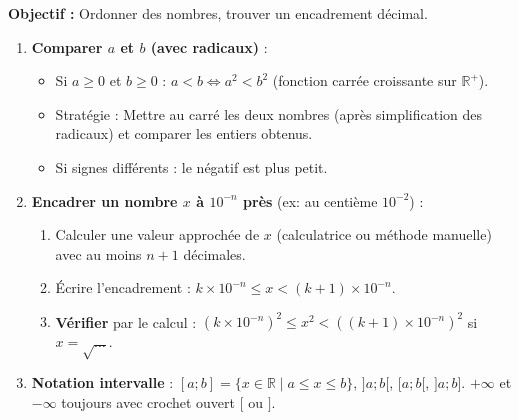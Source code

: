 \documentclass[11pt]{article}
\begin{document}
\begin{methode}
\textbf{Objectif :} Ordonner des nombres, trouver un encadrement décimal.
\begin{enumerate}
    \item \textbf{Comparer $a$ et $b$ (avec radicaux)} :
    \begin{itemize}
        \item Si $a \ge 0$ et $b \ge 0$ : $a < b \iff a^2 < b^2$ (fonction carrée croissante sur $\mathbb{R}^+$).
        \item Stratégie : Mettre au carré les deux nombres (après simplification des radicaux) et comparer les entiers obtenus.
        \item Si signes différents : le négatif est plus petit.
    \end{itemize}
    \item \textbf{Encadrer un nombre $x$ à $10^{-n}$ près} (ex: au centième $10^{-2}$) :
    \begin{enumerate}
        \item Calculer une valeur approchée de $x$ (calculatrice ou méthode manuelle) avec au moins $n+1$ décimales.
        \item Écrire l'encadrement : $k \times 10^{-n} \le x < (k+1) \times 10^{-n}$.
        \item \textbf{Vérifier} par le calcul : $(k \times 10^{-n})^2 \le x^2 < ((k+1) \times 10^{-n})^2$ si $x=\sqrt{\dots}$.
    \end{enumerate}
    \item \textbf{Notation intervalle} : $[a;b] = \{x \in \mathbb{R} \mid a \le x \le b\}$, $]a;b[$, $[a;b[$, $]a;b]$. $+\infty$ et $-\infty$ toujours avec crochet ouvert $[$ ou $]$.
\end{enumerate}
\end{methode}
\end{document}
